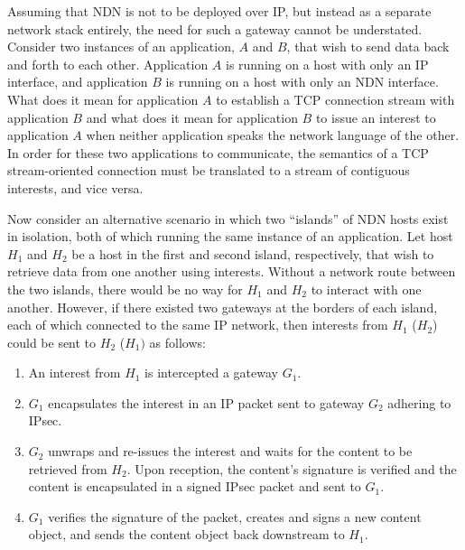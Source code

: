 Assuming that NDN is not to be deployed over IP, but instead as a separate network stack entirely, the need for such a gateway cannot be understated. Consider two instances of an application, $A$ and $B$, that wish to send data back and forth to each other. Application $A$ is running on a host with only an IP interface, and application $B$ is running on a host with only an NDN interface. What does it mean for application $A$ to establish a TCP connection stream with application $B$ and what does it mean for application $B$ to issue an interest to application $A$ when neither application speaks the network language of the other. In order for these two applications to communicate, the semantics of a TCP stream-oriented connection must be translated to a stream of contiguous interests, and vice versa. 

Now consider an alternative scenario in which two ``islands'' of NDN hosts exist in isolation, both of which running the same instance of an application. Let host $H_1$ and $H_2$ be a host in the first and second island, respectively, that wish to retrieve data from one another using interests. Without a network route between the two islands, there would be no way for $H_1$ and $H_2$ to interact with one another. However, if there existed two gateways at the borders of each island, each of which connected to the same IP network, then interests from $H_1$ ($H_2$) could be sent to $H_2$ ($H_1)$ as follows:
\begin{enumerate} 
	\item An interest from $H_1$ is intercepted a gateway $G_1$.
	\item $G_1$ encapsulates the interest in an IP packet sent to gateway $G_2$ adhering to IPsec.
	\item $G_2$ unwraps and re-issues the interest and waits for the content to be retrieved from $H_2$. Upon reception, the content's signature is verified and the content is encapsulated in a signed IPsec packet and sent to $G_1$. 
	\item $G_1$ verifies the signature of the packet, creates and signs a new content object, and sends the content object back downstream to $H_1$.
\end{enumerate}



